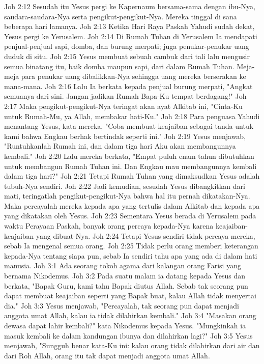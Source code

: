 Joh 2:12  Sesudah itu Yesus pergi ke Kapernaum bersama-sama dengan ibu-Nya, saudara-saudara-Nya serta pengikut-pengikut-Nya. Mereka tinggal di sana beberapa hari lamanya.
Joh 2:13  Ketika Hari Raya Paskah Yahudi sudah dekat, Yesus pergi ke Yerusalem.
Joh 2:14  Di Rumah Tuhan di Yerusalem Ia mendapati penjual-penjual sapi, domba, dan burung merpati; juga penukar-penukar uang duduk di situ.
Joh 2:15  Yesus membuat sebuah cambuk dari tali lalu mengusir semua binatang itu, baik domba maupun sapi, dari dalam Rumah Tuhan. Meja-meja para penukar uang dibalikkan-Nya sehingga uang mereka berserakan ke mana-mana.
Joh 2:16  Lalu Ia berkata kepada penjual burung merpati, "Angkat semuanya dari sini. Jangan jadikan Rumah Bapa-Ku tempat berdagang!"
Joh 2:17  Maka pengikut-pengikut-Nya teringat akan ayat Alkitab ini, "Cinta-Ku untuk Rumah-Mu, ya Allah, membakar hati-Ku."
Joh 2:18  Para penguasa Yahudi menantang Yesus, kata mereka, "Coba membuat keajaiban sebagai tanda untuk kami bahwa Engkau berhak bertindak seperti ini."
Joh 2:19  Yesus menjawab, "Runtuhkanlah Rumah ini, dan dalam tiga hari Aku akan membangunnya kembali."
Joh 2:20  Lalu mereka berkata, "Empat puluh enam tahun dibutuhkan untuk membangun Rumah Tuhan ini. Dan Engkau mau membangunnya kembali dalam tiga hari?"
Joh 2:21  Tetapi Rumah Tuhan yang dimaksudkan Yesus adalah tubuh-Nya sendiri.
Joh 2:22  Jadi kemudian, sesudah Yesus dibangkitkan dari mati, teringatlah pengikut-pengikut-Nya bahwa hal itu pernah dikatakan-Nya. Maka percayalah mereka kepada apa yang tertulis dalam Alkitab dan kepada apa yang dikatakan oleh Yesus.
Joh 2:23  Sementara Yesus berada di Yerusalem pada waktu Perayaan Paskah, banyak orang percaya kepada-Nya karena keajaiban-keajaiban yang dibuat-Nya.
Joh 2:24  Tetapi Yesus sendiri tidak percaya mereka, sebab Ia mengenal semua orang.
Joh 2:25  Tidak perlu orang memberi keterangan kepada-Nya tentang siapa pun, sebab Ia sendiri tahu apa yang ada di dalam hati manusia.
Joh 3:1  Ada seorang tokoh agama dari kalangan orang Farisi yang bernama Nikodemus.
Joh 3:2  Pada suatu malam ia datang kepada Yesus dan berkata, "Bapak Guru, kami tahu Bapak diutus Allah. Sebab tak seorang pun dapat membuat keajaiban seperti yang Bapak buat, kalau Allah tidak menyertai dia."
Joh 3:3  Yesus menjawab, "Percayalah, tak seorang pun dapat menjadi anggota umat Allah, kalau ia tidak dilahirkan kembali."
Joh 3:4  "Masakan orang dewasa dapat lahir kembali?" kata Nikodemus kepada Yesus. "Mungkinkah ia masuk kembali ke dalam kandungan ibunya dan dilahirkan lagi?"
Joh 3:5  Yesus menjawab, "Sungguh benar kata-Ku ini: kalau orang tidak dilahirkan dari air dan dari Roh Allah, orang itu tak dapat menjadi anggota umat Allah.
